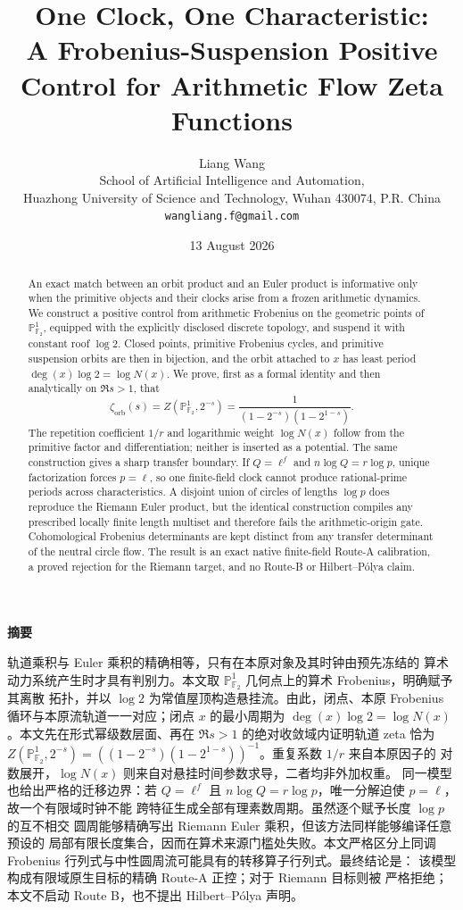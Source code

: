 \documentclass[11pt]{article}
\title{\textbf{One Clock, One Characteristic:}\\
A Frobenius-Suspension Positive Control for Arithmetic Flow Zeta Functions}
\author{Liang Wang\\
\small School of Artificial Intelligence and Automation,\\[-2pt]
\small Huazhong University of Science and Technology, Wuhan 430074, P.R. China\\
\small \texttt{wangliang.f@gmail.com}}
\date{13 August 2026}
\theoremstyle{definition}
\theoremstyle{remark}
\newcommand{\F}{\mathbb{F}}
\begin{document}
\maketitle

\begin{abstract}
An exact match between an orbit product and an Euler product is informative
only when the primitive objects and their clocks arise from a frozen
arithmetic dynamics.  We construct a positive control from arithmetic
Frobenius on the geometric points of
\(\mathbb P^1_{\F_2}\), equipped with the explicitly disclosed discrete
topology, and suspend it with constant roof \(\log 2\).  Closed points,
primitive Frobenius cycles, and primitive suspension orbits are then in
bijection, and the orbit attached to \(x\) has least period
\(\deg(x)\log 2=\log N(x)\).  We prove, first as a formal identity and then
analytically on \(\Re s>1\), that
\[
  \zeta_{\mathrm{orb}}(s)
  =Z(\mathbb P^1_{\F_2},2^{-s})
  =\frac{1}{(1-2^{-s})(1-2^{1-s})}.
\]
The repetition coefficient \(1/r\) and logarithmic weight \(\log N(x)\)
follow from the primitive factor and differentiation; neither is inserted as
a potential.  The same construction gives a sharp transfer boundary.  If
\(Q=\ell^f\) and \(n\log Q=r\log p\), unique factorization forces
\(p=\ell\), so one finite-field clock cannot produce rational-prime periods
across characteristics.  A disjoint union of circles of lengths \(\log p\)
does reproduce the Riemann Euler product, but the identical construction
compiles any prescribed locally finite length multiset and therefore fails
the arithmetic-origin gate.  Cohomological Frobenius determinants are kept
distinct from any transfer determinant of the neutral circle flow.  The
result is an exact native finite-field Route-A calibration, a proved rejection
for the Riemann target, and no Route-B or Hilbert--P\'olya claim.
\end{abstract}

\ifPDFTeX\else
\begin{center}
{\zhfont\bfseries 摘要}
\end{center}
{\zhfont
轨道乘积与 Euler 乘积的精确相等，只有在本原对象及其时钟由预先冻结的
算术动力系统产生时才具有判别力。本文取
\(\mathbb P^1_{\mathbb F_2}\) 几何点上的算术 Frobenius，明确赋予其离散
拓扑，并以 \(\log 2\) 为常值屋顶构造悬挂流。由此，闭点、本原
Frobenius 循环与本原流轨道一一对应；闭点 \(x\) 的最小周期为
\(\deg(x)\log2=\log N(x)\)。本文先在形式幂级数层面、再在
\(\Re s>1\) 的绝对收敛域内证明轨道 zeta 恰为
\(Z(\mathbb P^1_{\mathbb F_2},2^{-s})
=((1-2^{-s})(1-2^{1-s}))^{-1}\)。重复系数 \(1/r\) 来自本原因子的
对数展开，\(\log N(x)\) 则来自对悬挂时间参数求导，二者均非外加权重。
同一模型也给出严格的迁移边界：若 \(Q=\ell^f\) 且
\(n\log Q=r\log p\)，唯一分解迫使 \(p=\ell\)，故一个有限域时钟不能
跨特征生成全部有理素数周期。虽然逐个赋予长度 \(\log p\) 的互不相交
圆周能够精确写出 Riemann Euler 乘积，但该方法同样能够编译任意预设的
局部有限长度集合，因而在算术来源门槛处失败。本文严格区分上同调
Frobenius 行列式与中性圆周流可能具有的转移算子行列式。最终结论是：
该模型构成有限域原生目标的精确 Route-A 正控；对于 Riemann 目标则被
严格拒绝；本文不启动 Route B，也不提出 Hilbert--Pólya 声明。
}
\fi
\end{document}
